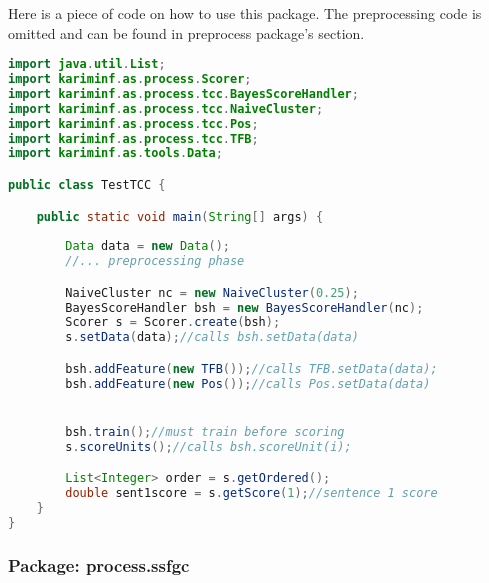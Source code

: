 Here is a piece of code on how to use this package. 
The preprocessing code is omitted and can be found in preprocess package's section.  
\begin{lstlisting}[language={Java}, style=codeStyle]
import java.util.List;
import kariminf.as.process.Scorer;
import kariminf.as.process.tcc.BayesScoreHandler;
import kariminf.as.process.tcc.NaiveCluster;
import kariminf.as.process.tcc.Pos;
import kariminf.as.process.tcc.TFB;
import kariminf.as.tools.Data;

public class TestTCC {

    public static void main(String[] args) {
    
        Data data = new Data();
        //... preprocessing phase

        NaiveCluster nc = new NaiveCluster(0.25);
        BayesScoreHandler bsh = new BayesScoreHandler(nc);
        Scorer s = Scorer.create(bsh);
        s.setData(data);//calls bsh.setData(data)

        bsh.addFeature(new TFB());//calls TFB.setData(data);
        bsh.addFeature(new Pos());//calls Pos.setData(data)


        bsh.train();//must train before scoring
        s.scoreUnits();//calls bsh.scoreUnit(i);

        List<Integer> order = s.getOrdered();
        double sent1score = s.getScore(1);//sentence 1 score
    }
}

\end{lstlisting}

\subsubsection{Package: process.ssfgc}

